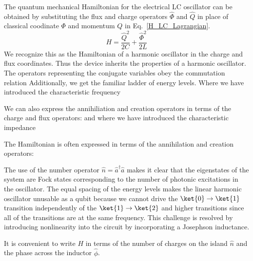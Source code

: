 The quantum mechanical Hamiltonian for the electrical LC oscillator can be obtained by substituting the flux and charge operators $\hat{\Phi}$ and $\hat{Q}$
in place of classical coodinate $\Phi$ and momentum $Q$ in Eq.~\ref{H_LC_Lagrangian}.
\begin{equation}
    H = \frac{\hat{Q}^2}{2C} + \frac{\hat{\Phi}^2}{2L}
\end{equation}
We recognize this as the Hamiltonian of a harmonic oscillator in the charge and flux coordinates.
Thus the device inherits the properties of a harmonic oscillator.
The operators representing the conjugate variables obey the commutation relation
Additionally, we get the familiar ladder of energy levels.
Where we have introduced the characteristic frequency

We can also express the annihiliation and creation operators in terms of the charge and flux operators:
and
where we have introduced the characteristic impedance

The Hamiltonian is often expressed in terms of the annihilation and creation operators:

\noindent
The use of the number operator $\hat{n} = \hat{a}^\dagger \hat{a}$ makes it clear that the eigenstates of the system are Fock states corresponding to the number
of photonic excitations in the oscillator.
The equal spacing of the energy levels makes the linear harmonic oscillator unusable as a qubit because we cannot drive the
$\ket{0} \rightarrow \ket{1}$ transition independently of the $\ket{1} \rightarrow \ket{2}$ and higher transitions since all of the transitions are at the same frequency.
This challenge is resolved by introducing nonlinearity into the circuit by incorporating a Josephson inductance.

It is convenient to write $H$ in terms of the number of charges on the island $\hat{n}$ and the phase across the inductor $\hat{\phi}$.

